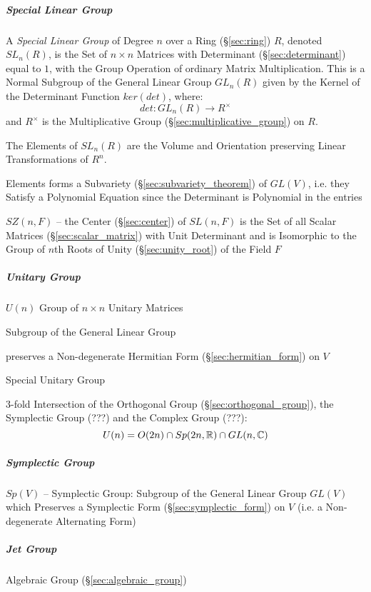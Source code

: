 \begin{itemize}
\subparagraph{Special Linear Group}\label{sec:special_linear_group}\hfill

A \emph{Special Linear Group} of Degree $n$ over a Ring (\S\ref{sec:ring}) $R$,
denoted $SL_n(R)$, is the Set of $n \times n$ Matrices with Determinant
(\S\ref{sec:determinant}) equal to $1$, with the Group Operation of ordinary
Matrix Multiplication. This is a Normal Subgroup of the General Linear Group
$GL_n(R)$ given by the Kernel of the Determinant Function $ker(det)$, where:
\[
  det : GL_n(R) \rightarrow R^\times
\]
and $R^\times$ is the Multiplicative Group
(\S\ref{sec:multiplicative_group}) on $R$.

The Elements of $SL_n(R)$ are the Volume and Orientation preserving
Linear Transformations of $R^n$.

Elements forms a Subvariety (\S\ref{sec:subvariety_theorem}) of $GL(V)$, i.e.
they Satisfy a Polynomial Equation since the Determinant is Polynomial in the
entries

$SZ(n,F)$ -- the Center (\S\ref{sec:center}) of $SL(n,F)$ is the Set of all
Scalar Matrices (\S\ref{sec:scalar_matrix}) with Unit Determinant and is
Isomorphic to the Group of $n$th Roots of Unity (\S\ref{sec:unity_root}) of the
Field $F$



\subparagraph{Unitary Group}\label{sec:unitary_group}\hfill

$U(n)$ Group of $n \times n$ Unitary Matrices

Subgroup of the General Linear Group

preserves a Non-degenerate Hermitian Form (\S\ref{sec:hermitian_form}) on $V$

Special Unitary Group

3-fold Intersection of the Orthogonal Group (\S\ref{sec:orthogonal_group}), the
Symplectic Group (???) and the Complex Group (???): %
\[
  U(n) = O(2n) \cap Sp(2n,\mathbb{R}) \cap GL(n,\mathbb{C})
\]



\subparagraph{Symplectic Group}\label{sec:symplectic_group}\hfill

$Sp(V)$ -- Symplectic Group: Subgroup of the General Linear Group $GL(V)$ which
Preserves a Symplectic Form (\S\ref{sec:symplectic_form}) on $V$ (i.e. a
Non-degenerate Alternating Form)



\subparagraph{Jet Group}\label{sec:jet_group}\hfill

Algebraic Group (\S\ref{sec:algebraic_group})




\end{itemize}
